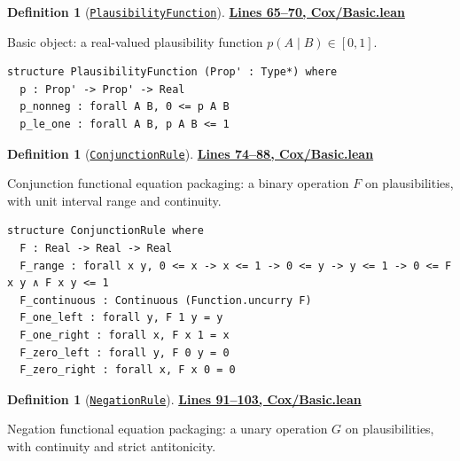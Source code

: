 \documentclass[11pt]{article}
\theoremstyle{definition}
\newtheorem{definition}[theorem]{Definition}
\theoremstyle{remark}
\begin{document}
\begin{definition}[\href{https://github.com/zariuq/ks-foundations-of-inference/blob/main/ProbabilityTheory/Cox/Basic.lean\#L65}{\texttt{PlausibilityFunction}}]
\textbf{\href{https://github.com/zariuq/ks-foundations-of-inference/blob/main/ProbabilityTheory/Cox/Basic.lean\#L65-L70}{Lines 65--70, Cox/Basic.lean}}

Basic object: a real-valued plausibility function $p(A\mid B)\in[0,1]$.
\end{definition}

\begin{lstlisting}[caption={Cox plausibility function interface}]
structure PlausibilityFunction (Prop' : Type*) where
  p : Prop' -> Prop' -> Real
  p_nonneg : forall A B, 0 <= p A B
  p_le_one : forall A B, p A B <= 1
\end{lstlisting}

\begin{definition}[\href{https://github.com/zariuq/ks-foundations-of-inference/blob/main/ProbabilityTheory/Cox/Basic.lean\#L74}{\texttt{ConjunctionRule}}]
\textbf{\href{https://github.com/zariuq/ks-foundations-of-inference/blob/main/ProbabilityTheory/Cox/Basic.lean\#L74-L88}{Lines 74--88, Cox/Basic.lean}}

Conjunction functional equation packaging: a binary operation $F$ on plausibilities, with unit interval
range and continuity.
\end{definition}

\begin{lstlisting}[caption={Cox conjunction rule interface}]
structure ConjunctionRule where
  F : Real -> Real -> Real
  F_range : forall x y, 0 <= x -> x <= 1 -> 0 <= y -> y <= 1 -> 0 <= F x y ∧ F x y <= 1
  F_continuous : Continuous (Function.uncurry F)
  F_one_left : forall y, F 1 y = y
  F_one_right : forall x, F x 1 = x
  F_zero_left : forall y, F 0 y = 0
  F_zero_right : forall x, F x 0 = 0
\end{lstlisting}

\begin{definition}[\href{https://github.com/zariuq/ks-foundations-of-inference/blob/main/ProbabilityTheory/Cox/Basic.lean\#L91}{\texttt{NegationRule}}]
\textbf{\href{https://github.com/zariuq/ks-foundations-of-inference/blob/main/ProbabilityTheory/Cox/Basic.lean\#L91-L103}{Lines 91--103, Cox/Basic.lean}}

Negation functional equation packaging: a unary operation $G$ on plausibilities, with continuity and
strict antitonicity.
\end{definition}
\end{document}
